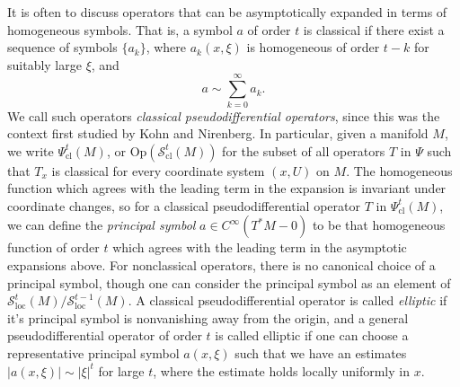 It is often to discuss operators that can be asymptotically expanded in terms of homogeneous symbols. That is, a symbol $a$ of order $t$ is classical if there exist a sequence of symbols $\{ a_k \}$, where $a_k(x,\xi)$ is homogeneous of order $t - k$ for suitably large $\xi$, and
%
\[ a \sim \sum_{k = 0}^\infty a_k. \]
%
We call such operators \emph{classical pseudodifferential operators}, since this was the context first studied by Kohn and Nirenberg. In particular, given a manifold $M$, we write $\Psi_{\text{cl}}^t(M)$, or $\text{Op}(\mathcal{S}^t_{\text{cl}}(M))$ for the subset of all operators $T$ in $\Psi$ such that $T_x$ is classical for every coordinate system $(x,U)$ on $M$. The homogeneous function which agrees with the leading term in the expansion is invariant under coordinate changes, so for a classical pseudodifferential operator $T$ in $\Psi_{\text{cl}}^t(M)$, we can define the \emph{principal symbol} $a \in C^\infty(T^* M - 0)$ to be that homogeneous function of order $t$ which agrees with the leading term in the asymptotic expansions above. For nonclassical operators, there is no canonical choice of a principal symbol, though one can consider the principal symbol as an element of $\mathcal{S}^t_{\text{loc}}(M) / \mathcal{S}^{t-1}_{\text{loc}}(M)$. A classical pseudodifferential operator is called \emph{elliptic} if it's principal symbol is nonvanishing away from the origin, and a general pseudodifferential operator of order $t$ is called elliptic if one can choose a representative principal symbol $a(x,\xi)$ such that we have an estimates $|a(x,\xi)| \sim |\xi|^t$ for large $t$, where the estimate holds locally uniformly in $x$.


